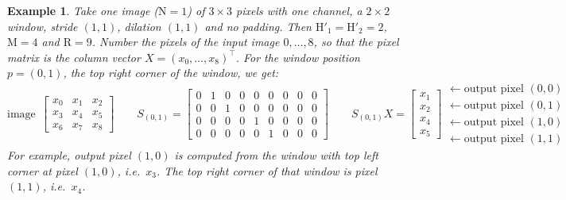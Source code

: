 \documentclass[twoside,11pt]{article}
\newtheorem{example}{Example}
\newcommand{\const}[1]{\ensuremath{\mathrm{#1}}} %
\newcommand{\Hout}{\const{H}'}       %
\begin{document}
\begin{example} \label{example:selection}
Take one image ($\const{N} = 1$) of $3 \times 3$ pixels with one channel, a $2 \times 2$ window, stride $(1,1)$, dilation $(1,1)$ and no padding.
Then $\Hout_1 = \Hout_2 = 2$, $\const{M} = 4$ and $\const{R} = 9$.
Number the pixels of the input image $0, \ldots, 8$, so that the pixel matrix is the column vector $X = (x_0, \ldots, x_8)^\top$.
For the window position $p = (0,1)$, the top right corner of the window, we get:
\[
\text{image}\ \
\begin{bmatrix}
x_0 & x_1 & x_2 \\
x_3 & x_4 & x_5 \\
x_6 & x_7 & x_8
\end{bmatrix}
\qquad
S_{(0,1)} =
\begin{bmatrix}
0 & 1 & 0 & 0 & 0 & 0 & 0 & 0 & 0 \\
0 & 0 & 1 & 0 & 0 & 0 & 0 & 0 & 0 \\
0 & 0 & 0 & 0 & 1 & 0 & 0 & 0 & 0 \\
0 & 0 & 0 & 0 & 0 & 1 & 0 & 0 & 0
\end{bmatrix}
\qquad
S_{(0,1)} X =
\begin{bmatrix}
x_1 \\ x_2 \\ x_4 \\ x_5
\end{bmatrix}
\begin{matrix}
\leftarrow \text{output pixel } (0,0) \\
\leftarrow \text{output pixel } (0,1) \\
\leftarrow \text{output pixel } (1,0) \\
\leftarrow \text{output pixel } (1,1)
\end{matrix}
\]
For example, output pixel $(1,0)$ is computed from the window with top left corner at pixel $(1,0)$, i.e.\ $x_3$. The top right corner of that window is pixel $(1,1)$, i.e.\ $x_4$.
\end{example}
\end{document}
